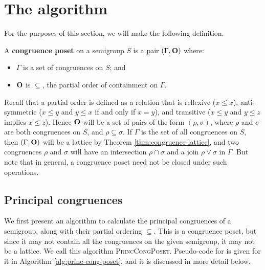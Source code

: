 \section{The algorithm}
\label{sec:lattice-algorithm}

For the purposes of this section, we will make the following definition.

\begin{definition}
  \label{def:congruence-poset}
  A \textbf{congruence poset} on a semigroup $S$ is a pair $(\Gamma, \mathbf{O})$
  where:
  \begin{itemize}
  \item $\Gamma$ is a set of congruences on $S$; and
  \item $\mathbf{O}$ is $\subseteq$, the partial order of containment on $\Gamma$.
  \end{itemize}
\end{definition}

Recall that a partial order is defined as a relation that is reflexive
($x \leq x$), anti-symmetric ($x \leq y$ and $y \leq x$ if and only if $x = y$),
and transitive ($x \leq y$ and $y \leq z$ implies $x \leq z$).
Hence $\mathbf{O}$ will be a set of pairs of the form $(\rho, \sigma)$, where $\rho$
and $\sigma$ are both congruences on $S$, and $\rho \subseteq \sigma$.  If
$\Gamma$ is the set of all congruences on $S$, then $(\Gamma, \mathbf{O})$ will be a
lattice by Theorem \ref{thm:congruence-lattice}, and two congruences $\rho$ and
$\sigma$ will have an intersection $\rho \cap \sigma$ and a join
$\rho \vee \sigma$ in $\Gamma$.  But note that in general, a congruence poset
need not be closed under such operations.

\subsection{Principal congruences}
\label{sec:princ-cong-poset}

We first present an algorithm to calculate the principal congruences of a
semigroup, along with their partial ordering $\subseteq$.  This is a congruence
poset, but since it may not contain all the congruences on the given semigroup,
it may not be a lattice.  We call this algorithm \textsc{PrincCongPoset}.
Pseudo-code for is given for it in Algorithm \ref{alg:princ-cong-poset}, and it
is discussed in more detail below.

